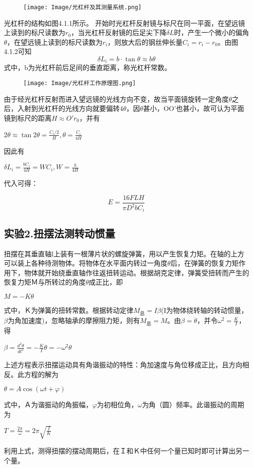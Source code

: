 \documentclass[11pt,a4paper,oneside]{article}
\begin{document}
\begin{figure}[H]
\centering
  \texttt{[image: Image/光杠杆及其测量系统.png]}
\end{figure}
光杠杆的结构如图4.1.1所示。
开始时光杠杆反射镜与标尺在同一平面，在望远镜上读到的标尺读数为$r_0$，当光杠杆反射镜的后足尖下降$\delta L$时，产生一个微小的偏角$\theta $，在望远镜上读到的标尺读数为$r_{i}$，则放大后的钢丝伸长量$C_{i}=r_i-r_0$。由图4.1.2可知
$$ \delta L_i=b\cdot \tan \theta \approx b\theta $$
式中，b为光杠杆前后足间的垂直距离，称光杠杆常数。
\begin{figure}[H]
\centering
  \texttt{[image: Image/光杠杆工作原理图.png]}
\end{figure}
由于经光杠杆反射而进入望远镜的光线方向不变，故当平面镜旋转一定角度$\theta$之后，入射到光杠杆的光线方向就要偏转$4\theta$，因$\theta$甚小，OO'也甚小，故可认为平面镜到标尺的距离$H\approx O'r_0$，并有
\begin{center}
$2\theta \approx \tan 2\theta = \displaystyle\frac{C_i/2}{H},\theta =\displaystyle\frac{C_i}{4H}$
\end{center}
因此有
\begin{center}
$\delta L_i=\displaystyle\frac{bC_i}{4H}=WC_i,W=\displaystyle\frac{b}{4H}$
\end{center}
代入可得：

$$ E=\displaystyle\frac{16FLH}{\pi D^2bC_i}$$

\subsection*{实验2.扭摆法测转动惯量}
扭摆在其垂直轴l上装有一根薄片状的螺旋弹簧，用以产生恢复力矩。在轴的上方可以装上各种待测物体。将物体在水平面内转过一角度$\theta$后，在弹簧的恢复力矩作用下，物体就开始绕垂直轴作往返扭转运动。根据胡克定律，弹簧受扭转而产生的恢复力矩Ｍ与所转过的角度$\theta$成正比，即
\begin{center}
$M=-K\theta$
\end{center}
式中，Ｋ为弹簧的扭转常数。根据转动定律$M_{\text{总}}=I{\beta}$(I为物体绕转轴的转动惯量，$\beta$为角加速度)，忽略轴承的摩擦阻力矩，则有$M_{\text{总}}=M$。由$\beta = \ddot{\theta}$，并令$\omega ^2=\displaystyle\frac{K}{I}$，得
\begin{center}
$\beta =\displaystyle\frac{d^2\theta}{dt^2}=-\displaystyle\frac{K}{I}\theta=-\omega ^2\theta $
\end{center}
上述方程表示扭摆运动具有角谐振动的特性：角加速度与角位移成正比，且方向相反。此方程的解为
\begin{center}
$\theta =A\cos (\omega t+\varphi )$
\end{center}
式中，Ａ为谐振动的角振幅，$\varphi$为初相位角，$\omega$为角（圆）频率。此谐振动的周期为
\begin{center}
$ T=\displaystyle\frac{2\pi }{\omega}=2\pi \sqrt{\displaystyle\frac{I}{K}}$
\end{center}
利用上式，测得扭摆的摆动周期后，在Ｉ和Ｋ中任何一个量已知时即可计算出另一个量。
\end{document}
